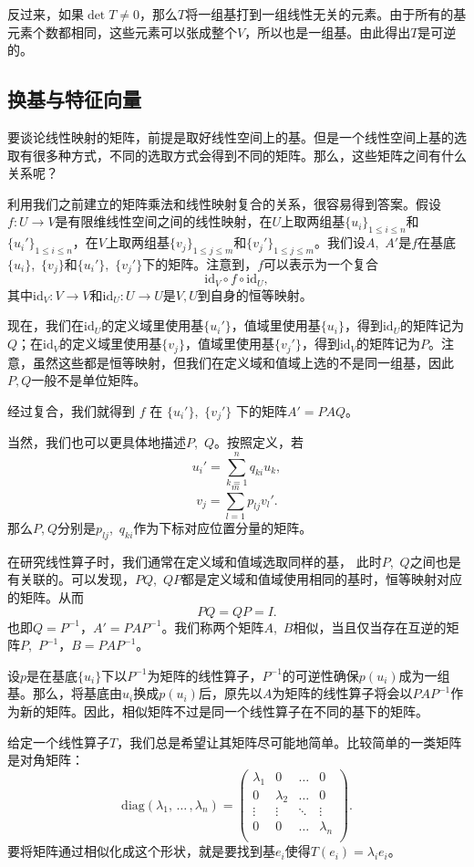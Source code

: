 反过来，如果$\det T\neq 0$，那么$T$将一组基打到一组线性无关的元素。由于所有的基元素个数都相同，这些元素可以张成整个$V$，所以也是一组基。由此得出$T$是可逆的。
\subsection{换基与特征向量}
要谈论线性映射的矩阵，前提是取好线性空间上的基。但是一个线性空间上基的选取有很多种方式，不同的选取方式会得到不同的矩阵。那么，这些矩阵之间有什么关系呢？

利用我们之前建立的矩阵乘法和线性映射复合的关系，很容易得到答案。假设$f:U\to V$是有限维线性空间之间的线性映射，在$U$上取两组基$\{u_i\}_{1\leq i\leq n}$和$\{u_i'\}_{1\leq i\leq n}$，在$V$上取两组基$\{v_j\}_{1\leq j\leq m}$和$\{v_j'\}_{1\leq j\leq m}$。我们设$A$,~$A'$是$f$在基底$\{u_i\}$,~$\{v_j\}$和$\{u_i'\}$,~$\{v_j'\}$下的矩阵。注意到，$f$可以表示为一个复合
\[\mathrm{id}_V\circ f\circ \mathrm{id}_U,\]
其中$\mathrm{id}_V:V\to V$和$\mathrm{id}_U:U\to U$是$V,U$到自身的恒等映射。

现在，我们在$\mathrm{id}_U$的定义域里使用基$\{u_i'\}$，值域里使用基$\{u_i\}$，得到$\mathrm{id}_U$的矩阵记为$Q$；在$\mathrm{id}_V$的定义域里使用基$\{v_j\}$，值域里使用基$\{v_j'\}$，得到$\mathrm{id}_V$的矩阵记为$P$。注意，虽然这些都是恒等映射，但我们在定义域和值域上选的不是同一组基，因此$P,Q$一般不是单位矩阵。

经过复合，我们就得到 $f$ 在 $\{u_i'\}$,~$\{v_j'\}$ 下的矩阵$A'=PAQ$。

当然，我们也可以更具体地描述$P$,~$Q$。按照定义，若
\[u_i'=\sum_{k=1}^nq_{ki}u_{k},\]
\[v_j=\sum_{l=1}^mp_{lj}v_l'.\]
那么$P$,$~Q$分别是$p_{lj}$,~$q_{ki}$作为下标对应位置分量的矩阵。

在研究线性算子时，我们通常在定义域和值域选取同样的基，
此时$P$,~$Q$之间也是有关联的。可以发现，$PQ$,~$QP$都是定义域和值域使用相同的基时，恒等映射对应的矩阵。从而
\[PQ=QP=I.\]
也即$Q=P^{-1}$，$A'=PAP^{-1}$。我们称两个矩阵$A$,~$B$相似，当且仅当存在互逆的矩阵$P$,~$P^{-1}$，$B=PAP^{-1}$。

设$p$是在基底$\{u_i\}$下以$P^{-1}$为矩阵的线性算子，$P^{-1}$的可逆性确保$p(u_i)$成为一组基。那么，将基底由$u_i$换成$p(u_i)$后，原先以$A$为矩阵的线性算子将会以$PAP^{-1}$作为新的矩阵。因此，相似矩阵不过是同一个线性算子在不同的基下的矩阵。

给定一个线性算子$T$，我们总是希望让其矩阵尽可能地简单。比较简单的一类矩阵是对角矩阵：
\[\mathrm{diag}(\lambda_1,\,\dots\,,\lambda_n)=\begin{pmatrix}
        \lambda_1 & 0         & \ldots & 0         \\
        0         & \lambda_2 & \ldots & 0         \\
        \vdots    & \vdots    & \ddots & \vdots    \\
        0         & 0         & \ldots & \lambda_n \\\end{pmatrix}.\]
要将矩阵通过相似化成这个形状，就是要找到基$e_i$使得$T(e_i)=\lambda_ie_i$。

